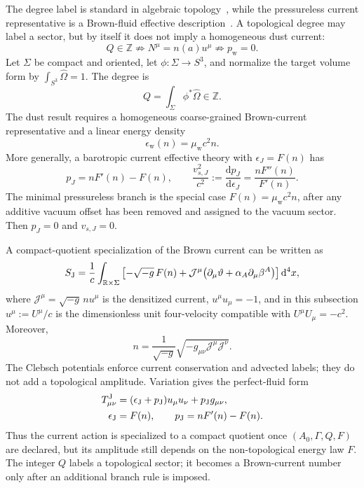 \documentclass[
  aps,
  prd,
  reprint,
  superscriptaddress,
  floatfix,
  nofootinbib,
  longbibliography
]{revtex4-2}
\theoremstyle{plain}
\theoremstyle{definition}
\theoremstyle{remark}
\newcommand{\dd}{\mathrm d}
\newcommand{\wind}{\mathrm w}
\newcommand{\Z}{\mathbb Z}
\newcommand{\eps}{\epsilon}
\begin{document}
The degree label is standard in algebraic topology~\cite{Hatcher}, while the
pressureless current representative is a Brown-fluid effective
description~\cite{BrownFluid}.  A topological degree may label a sector, but by
itself it does not imply a homogeneous dust current:
\begin{equation}
Q\in\Z\not\Rightarrow N^\mu=n(a)u^\mu\not\Rightarrow p_{\wind}=0 .
\label{eq:q_not_dust_v5}
\end{equation}
Let \(\Sigma\) be compact and oriented, let \(\phi:\Sigma\to S^3\), and
normalize the target volume form by \(\int_{S^3}\widehat\Omega=1\).  The degree is
\begin{equation}
Q=\int_\Sigma \phi^*\widehat\Omega\in\Z .
\label{eq:degree_v5}
\end{equation}
The dust result requires a homogeneous coarse-grained Brown-current
representative and a linear energy density
\begin{equation}
\eps_{\wind}(n)=\mu_{\wind}c^2n .
\label{eq:linear_current_v5}
\end{equation}
More generally, a barotropic current effective theory with
\(\eps_J=F(n)\) has
\begin{equation}
p_J=nF'(n)-F(n),
\qquad
\frac{v_{s,J}^2}{c^2}:=\frac{\dd p_J}{\dd\eps_J}
=\frac{nF''(n)}{F'(n)} .
\label{eq:current_atlas_v5}
\end{equation}
The minimal pressureless branch is the special case \(F(n)=\mu_{\wind}c^2n\),
after any additive vacuum offset has been removed and assigned to the vacuum
sector.  Then \(p_J=0\) and \(v_{s,J}=0\).

A compact-quotient specialization of the Brown current can be written as
\begin{equation}
S_{\rm J}
=\frac1c\int_{\mathbb R\times\Sigma}
\left[-\sqrt{-g}\,F(n)
+{\mathcal J}^{\mu}
\bigl(\partial_\mu\vartheta+\alpha_A\partial_\mu\beta^A\bigr)
\right]\dd^4x,
\label{eq:brown_action_compact_v13}
\end{equation}
where \({\mathcal J}^{\mu}=\sqrt{-g}\,n u^\mu\) is the densitized current,
\(u^\mu u_\mu=-1\), and in this subsection \(u^\mu:=U^\mu/c\) is the
dimensionless unit four-velocity compatible with \(U^\mu U_\mu=-c^2\).  Moreover,
\begin{equation}
n=\frac{1}{\sqrt{-g}}
\sqrt{-g_{\mu\nu}{\mathcal J}^{\mu}{\mathcal J}^{\nu}} .
\label{eq:brown_n_v13}
\end{equation}
The Clebsch potentials enforce current conservation and advected labels; they do
not add a topological amplitude.  Variation gives the perfect-fluid form
\begin{equation}
\begin{aligned}
T^{\rm J}_{\mu\nu}
&=(\eps_{\rm J}+p_{\rm J})u_\mu u_\nu+p_{\rm J}g_{\mu\nu},\\
\eps_{\rm J}&=F(n),
\qquad
p_{\rm J}=nF'(n)-F(n).
\end{aligned}
\label{eq:brown_stress_v13}
\end{equation}
Thus the current action is specialized to a compact quotient once
\((A_0,\Gamma,Q,F)\) are declared, but its amplitude still depends on the
non-topological energy law \(F\).  The integer \(Q\) labels a topological sector;
it becomes a Brown-current number only after an additional branch rule is
imposed.
\end{document}
